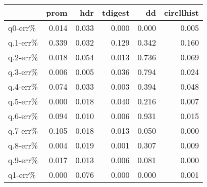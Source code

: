 \begin{tabular}{lrrrrr}
\toprule
{} &  prom &   hdr &  tdigest &    dd &  circllhist \\
\midrule
q0-err\%  & 0.014 & 0.033 &    0.000 & 0.000 &       0.005 \\
q.1-err\% & 0.339 & 0.032 &    0.129 & 0.342 &       0.160 \\
q.2-err\% & 0.018 & 0.054 &    0.013 & 0.736 &       0.069 \\
q.3-err\% & 0.006 & 0.005 &    0.036 & 0.794 &       0.024 \\
q.4-err\% & 0.074 & 0.033 &    0.003 & 0.394 &       0.048 \\
q.5-err\% & 0.000 & 0.018 &    0.040 & 0.216 &       0.007 \\
q.6-err\% & 0.094 & 0.010 &    0.006 & 0.931 &       0.015 \\
q.7-err\% & 0.105 & 0.018 &    0.013 & 0.050 &       0.000 \\
q.8-err\% & 0.004 & 0.019 &    0.001 & 0.307 &       0.009 \\
q.9-err\% & 0.017 & 0.013 &    0.006 & 0.081 &       0.000 \\
q1-err\%  & 0.000 & 0.076 &    0.000 & 0.000 &       0.001 \\
\bottomrule
\end{tabular}
